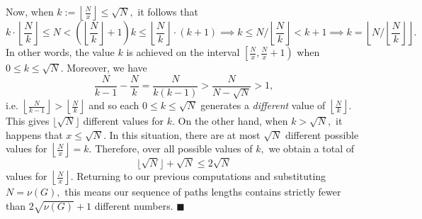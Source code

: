 \documentclass{article}
\begin{document}
  Now, when $k:=\left\lfloor \frac{N}{x}\right\rfloor \leq \sqrt{N},$ it follows that $$k\cdot \left\lfloor \frac{N}{k}\right\rfloor\leq N<\left(\left\lfloor \frac{N}{k}\right\rfloor+1\right)k\leq \left\lfloor \frac{N}{k}\right\rfloor\cdot (k+1)\implies k\leq N/\left\lfloor \frac{N}{k}\right\rfloor<k+1\implies k=\left\lfloor N/\left\lfloor \frac{N}{k}\right\rfloor\right\rfloor.$$In other words, the value $k$ is achieved on the interval $\left[\frac{N}{x},\frac{N}{x}+1\right)$ when $0\leq k\leq \sqrt{N}.$ Moreover, we have
  $$\frac{N}{k-1}-\frac{N}{k}=\frac{N}{k(k-1)}>\frac{N}{N-\sqrt{N}}>1,$$i.e. $\left\lfloor \frac{N}{k-1}\right\rfloor >\left\lfloor \frac{N}{k}\right\rfloor$ and so each $0\leq k\leq \sqrt{N}$ generates  a \textit{different} value of $\left\lfloor \frac{N}{k}\right\rfloor.$ This gives $\lfloor \sqrt{N}\rfloor$ different values for $k$. On the other hand, when $k>\sqrt{N},$ it happens that $x\leq \sqrt{N}.$ In this situation, there are at most $\sqrt{N}$ different possible values for $\left\lfloor \frac{N}{x}\right\rfloor=k.$ Therefore, over all possible values of $k,$ we obtain a total of $$\lfloor \sqrt{N}\rfloor +\sqrt{N}\leq 2\sqrt{N}$$values for $\left\lfloor \frac{N}{x}\right\rfloor.$ Returning to our previous computations and substituting $N=\nu(G),$ this means our sequence of paths lengths contains strictly fewer than $2\sqrt{\nu(G)}+1$ different numbers. $\blacksquare$








\end{document}
